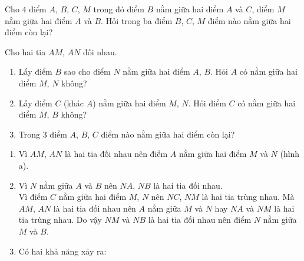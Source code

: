 \begin{bt}%
	Cho $ 4 $ điểm $ A $, $ B $, $ C $, $ M $ trong đó điểm $ B $ nằm giữa hai điểm $ A $ và $ C $, điểm $ M $ nằm giữa hai điểm $ A $ và $ B $. Hỏi trong ba điểm $ B $, $ C $, $ M $ điểm nào nằm giữa hai điểm còn lại?
\end{bt}

\begin{bt}%
	Cho hai tia $AM$, $AN$ đối nhau.
	\begin{enumerate}
		\item Lấy điểm $B$ sao cho điểm $N$ nằm giữa hai điểm $A$, $B$. Hỏi $A$ có nằm giữa hai điểm $M$, $N$ không?
		\item Lấy điểm $C$ (khác $A$) nằm giữa hai điểm $M$, $N$. Hỏi điểm $C$ có nằm giữa hai điểm $M$, $B$ không?
		\item Trong $3$ điểm $A$, $B$, $C$ điểm nào nằm giữa hai điểm còn lại?
	\end{enumerate}
	\loigiai
	{
		\begin{enumerate}
			\item Vì $AM$, $AN$ là hai tia đối nhau nên điểm $A$ nằm giữa hai điểm $M$ và $N$ (hình a).
			\begin{center}
			\end{center}
			\item Vì $N$ nằm giữa $A$ và $B$ nên $NA$, $NB$ là hai tia đối nhau.\\
			Vì điểm $C$ nằm giữa hai điểm $M$, $N$ nên $NC$, $NM$ là hai tia trùng nhau. Mà $AM$, $AN$ là hai tia đối nhau nên $A$ nằm giữa $M$ và $N$ hay $NA$ và $NM$ là hai tia trùng nhau. Do vậy $NM$ và $NB$ là hai tia đối nhau nên điểm $N$ nằm giữa $M$ và $B$.
			\item Có hai khả năng xảy ra:

\end{enumerate}}
\end{bt}
